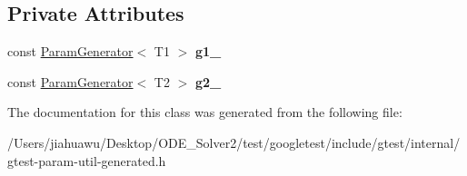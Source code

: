 \subsection*{Private Attributes}
\begin{DoxyCompactItemize}
\item 
\mbox{\label{classtesting_1_1internal_1_1_cartesian_product_generator2_a867afe39e21d3b9474c029f68efc0b1b}} 
const \mbox{\hyperlink{classtesting_1_1internal_1_1_param_generator}{Param\+Generator}}$<$ T1 $>$ {\bfseries g1\+\_\+}
\item 
\mbox{\label{classtesting_1_1internal_1_1_cartesian_product_generator2_abc38eec7b0ca7ecbd0c3038b67397460}} 
const \mbox{\hyperlink{classtesting_1_1internal_1_1_param_generator}{Param\+Generator}}$<$ T2 $>$ {\bfseries g2\+\_\+}
\end{DoxyCompactItemize}


The documentation for this class was generated from the following file\+:\begin{DoxyCompactItemize}
\item 
/\+Users/jiahuawu/\+Desktop/\+O\+D\+E\+\_\+\+Solver2/test/googletest/include/gtest/internal/gtest-\/param-\/util-\/generated.\+h\end{DoxyCompactItemize}
